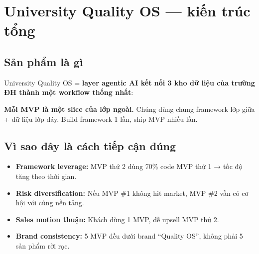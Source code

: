 \documentclass[11pt,a4paper]{article}
\begin{document}
\section{University Quality OS — kiến trúc tổng}

\subsection{Sản phẩm là gì}

University Quality OS = \textbf{layer agentic AI kết nối 3 kho dữ liệu của
trường ĐH thành một workflow thống nhất}:

\begin{center}
\end{center}

\textbf{Mỗi MVP là một slice của lớp ngoài.} Chúng dùng chung framework lớp giữa
+ dữ liệu lớp đáy. Build framework 1 lần, ship MVP nhiều lần.

\subsection{Vì sao đây là cách tiếp cận đúng}

\begin{itemize}
\item \textbf{Framework leverage:} MVP thứ 2 dùng 70\% code MVP thứ 1 → tốc độ tăng theo thời gian.
\item \textbf{Risk diversification:} Nếu MVP \#1 không hit market, MVP \#2 vẫn có cơ hội với cùng nền tảng.
\item \textbf{Sales motion thuận:} Khách dùng 1 MVP, dễ upsell MVP thứ 2.
\item \textbf{Brand consistency:} 5 MVP đều dưới brand ``Quality OS'', không phải 5 sản phẩm rời rạc.
\end{itemize}
\end{document}
